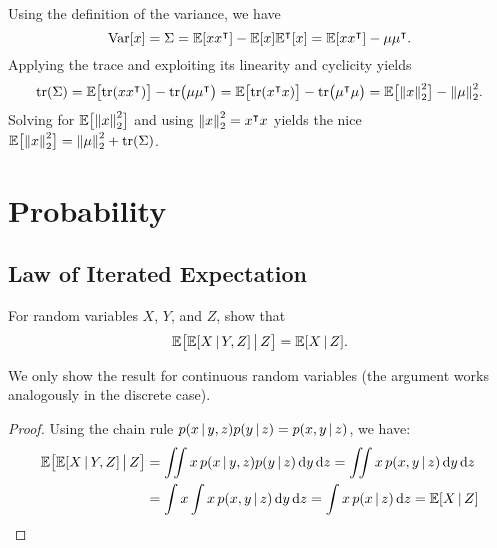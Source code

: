         \begin{solution}
            Using the definition of the variance, we have
            \begin{equation}
                \operatorname{Var}[x]
                    = \Sigma
                    = \mathbb{E}[x x^{\intercal}] - \mathbb{E}[x] \mathbb{E}^{\intercal}[x]
                    = \mathbb{E}[x x^{\intercal}] - \mu \mu^{\intercal}.
            \end{equation}
            Applying the trace and exploiting its linearity and cyclicity yields
            \begin{equation}
                \tr(\Sigma)
                    = \mathbb{E}\bigl[ \tr(x x^{\intercal}) \bigr] - \tr\bigl( \mu \mu^{\intercal} \bigr)
                    = \mathbb{E}\bigl[ \tr(x^{\intercal} x) \bigr] - \tr\bigl( \mu^{\intercal} \mu \bigr)
                    = \mathbb{E}\bigl[ \norm{x}_2^2 \bigr] - \norm{\mu}_2^2.
            \end{equation}
            Solving for \(\mathbb{E}\bigl[ \norm{x}_2^2 \bigr]\) and using \( \norm{x}_2^2 = x^{\intercal} x \) yields the nice \( \mathbb{E}\bigl[ \norm{x}_2^2 \bigr] = \norm{\mu}_2^2 + \tr(\Sigma) \).
        \end{solution}

\section{Probability}
    \subsection{Law of Iterated Expectation}
        For random variables \(X\), \(Y\), and \(Z\), show that
        \begin{equation}
            \mathbb{E}\bigl[ \mathbb{E}[X \,\vert\, Y, Z] \,\big\vert\, Z \bigr] = \mathbb{E}[X \,\vert\, Z].
        \end{equation}

        \begin{solution}
            We only show the result for continuous random variables (the argument works analogously in the discrete case).
            \begin{proof}
                Using the chain rule \( p(x \,\vert\, y, z) p(y \,\vert\, z) = p(x, y \,\vert\, z) \), we have:
                \begin{align}
                    \mathbb{E}\bigl[ \mathbb{E}[X \,\vert\, Y, Z] \,\big\vert\, Z \bigr]
                        &= \iint x \, p(x \,\vert\, y, z) p(y \,\vert\, z) \dd{y} \dd{z}
                         = \iint x \, p(x, y \,\vert\, z) \dd{y} \dd{z} \\
                        &= \int x \int x \, p(x, y \,\vert\, z) \dd{y} \dd{z}
                         = \int x \, p(x \,\vert\, z) \dd{z}
                         = \mathbb{E}[X \,\vert\, Z]
                \end{align}
            \end{proof}
        \end{solution}

